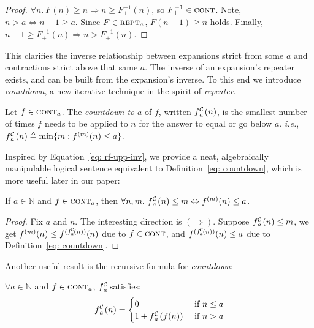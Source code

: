 \begin{proof}
$\forall n.~F(n)\ge n \Rightarrow n \ge F^{-1}_+(n)$, so $F^{-1}_+ \in
\text{\scshape{cont}}$. Note, $n > a \iff n-1\ge a$.
Since $F\in \text{\scshape{rept}}_a$, $F(n-1)\ge n$ holds.
Finally, $n-1\ge F^{-1}_+(n) \Rightarrow n > F^{-1}_+(n)$.
\end{proof}
This clarifies the inverse relationship between expansions strict from some $a$ and contractions strict above that same $a$. The inverse of an expansion's
repeater exists, and can be built from the expansion's inverse.
To this end we introduce \emph{countdown}, a new iterative technique in the
spirit of \emph{repeater}.
\begin{defn} \label{defn: informal-countdown} \label{eq: countdown}
Let $f\in \text{\scshape{cont}}_a$. The \textit{countdown to} $a$ of $f$, written
$\cdt{f}{a}(n)$, is the smallest number of times $f$ needs to be applied to
$n$ for the answer to equal or go below $a$. \emph{i.e.},
$\cdt{f}{a}(n) \triangleq \min\{m: f^{(m)}(n)\le a \}$.
\end{defn}
Inspired by Equation~\ref{eq: rf-upp-inv}, we provide a neat, algebraically manipulable logical sentence equivalent to Definition~\ref{eq: countdown}, which is more useful later in our paper:
\begin{col} \label{col: cdt-repeat}
If $a \in \mathbb{N}$ and $f\in \text{\scshape{cont}}_{a}$, then $\forall n, m.~ \cdt{f}{a}(n)\le m \iff f^{(m)}(n)\le a$.
\end{col}
\begin{proof}
	Fix $a$ and $n$. The interesting direction is $(\Rightarrow)$. Suppose $\cdt{f}{a}(n)\le m$, we get $f^{(m)}(n)\le f^{(\cdt{f}{a}(n))}(n)$ due to $f\in \text{\scshape{cont}}$, and $f^{(\cdt{f}{a}(n))}(n)\le a$ due to Definition~\ref{eq: countdown}.
\end{proof}
Another useful result is the recursive formula for \emph{countdown}:
\begin{thm} \label{thm: cdt-recursion}
	\href{https://github.com/inv-ack/inv-ack/blob/7270e64a2600b771f2b1b1b151f7d13fb2ae6c97/countdown.v#L219-L245}{\coq}
	$\forall a\in \mathbb{N}$ and $f\in \text{\scshape{cont}}_{a}$, $\cdt{f}{a}$ satisfies:
	\begin{equation*}
	\cdt{f}{a}(n) = \begin{cases}
	0 & \text{ if } n \le a \\ 1 + \cdt{f}{a}(f(n)) & \text{ if } n > a 
	\end{cases}
	\end{equation*}
\end{thm}
